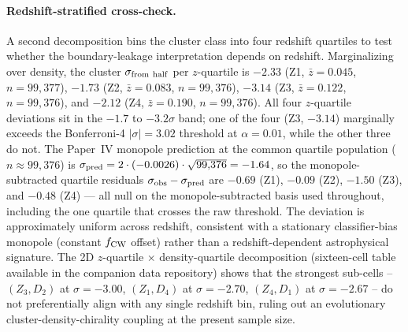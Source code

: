 \documentclass[twocolumn,linenumbers]{aastex702}
\begin{document}
\paragraph{Redshift-stratified cross-check.} A second decomposition
bins the cluster class into four redshift quartiles to test whether
the boundary-leakage interpretation depends on redshift. Marginalizing
over density, the cluster $\sigma_{\rm from\ half}$ per
$z$-quartile is $-2.33$ (Z1, $\bar z = 0.045$, $n = 99{,}377$),
$-1.73$ (Z2, $\bar z = 0.083$, $n = 99{,}376$), $-3.14$ (Z3,
$\bar z = 0.122$, $n = 99{,}376$), and $-2.12$ (Z4, $\bar z = 0.190$,
$n = 99{,}376$). All four $z$-quartile deviations sit in the
$-1.7$ to $-3.2\sigma$ band; one of the four (Z3, $-3.14$)
marginally exceeds the Bonferroni-4 $|\sigma| = 3.02$ threshold at
$\alpha = 0.01$, while the other three do not. The Paper~IV monopole
prediction at the common quartile population ($n \approx 99{,}376$)
is $\sigma_{\rm pred} = 2 \cdot (-0.0026) \cdot \sqrt{99{,}376}
= -1.64$, so the monopole-subtracted quartile residuals
$\sigma_{\rm obs} - \sigma_{\rm pred}$ are $-0.69$ (Z1), $-0.09$
(Z2), $-1.50$ (Z3), and $-0.48$ (Z4) — all null on the
monopole-subtracted basis used throughout, including the one
quartile that crosses the raw threshold. The
deviation is approximately uniform across redshift, consistent with
a stationary classifier-bias monopole (constant $f_{\rm CW}$ offset)
rather than a redshift-dependent astrophysical signature.
The 2D $z$-quartile $\times$ density-quartile decomposition
(sixteen-cell table available in the companion data repository) shows that the strongest
sub-cells -- $(Z_3, D_2)$ at $\sigma = -3.00$, $(Z_1, D_4)$ at
$\sigma = -2.70$, $(Z_4, D_1)$ at $\sigma = -2.67$ -- do not
preferentially align with any single redshift bin, ruling out an
evolutionary cluster-density-chirality coupling at the present
sample size.
\end{document}
